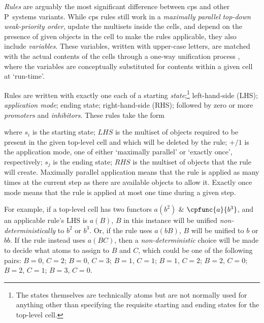 \emph{Rules} are arguably the most significant difference between \gls{cps} and other P~systems variants.  While \gls{cps} rules still work in a \emph{maximally parallel} \emph{top-down weak-priority order}, update the multisets inside the cells, and depend on the presence of given objects in the cell to make the rules applicable, they also include \emph{variables}.  These variables, written with upper-case letters, are matched with the actual contents of the cells through a one-way unification process \cite{Liu2021}, where the variables are conceptually substituted for contents within a given cell at `run-time'.

Rules are written with exactly one each of a starting \emph{state};\footnote{The states themselves are technically atoms but are not normally used for anything other than specifying the requisite starting and ending states for the top-level cell.} left-hand-side (LHS); \emph{application mode}; ending state; right-hand-side (RHS); followed by zero or more \emph{promoters} and \emph{inhibitors}.  These rules take the form
\begin{framed}
\vspace{-1.0cm}
\vspace{-0.7cm}
\end{framed} 
\noindent
where \(s_i\) is the starting state; \(LHS\) is the multiset of objects required to be present in the given top-level cell and which will be deleted by the rule; \(+/1\) is the application mode, one of either `maximally parallel' or `exactly once', respectively; \(s_j\) is the ending state; \(RHS\) is the multiset of objects that the rule will create.  Maximally parallel application means that the rule is applied as many times at the current step as there are available objects to allow it.  Exactly once mode means that the rule is applied at most one time during a given step.

For example, if a top-level cell has two functors \(a(b^2)\) \& \(\cpfunc{a}{b^3}\), and an applicable rule's LHS is \(a(B)\), \(B\) in this instance will be unified \emph{non-deterministically} to \(b^2\) or \(b^3\).  Or, if the rule uses \(a(bB)\), \(B\) will be unified to \(b\) or \(bb\).  If the rule instead uses \(a(BC)\), then a \emph{non-deterministic} choice will be made to decide what atoms to assign to \(B\) and \(C\), which could be one of the following pairs:  \(B=0\), \(C=2\); \(B=0\), \(C=3\); \(B=1\), \(C=1\); \(B=1\), \(C=2\); \(B=2\), \(C=0\); \(B=2\), \(C=1\); \(B=3\), \(C=0\).

